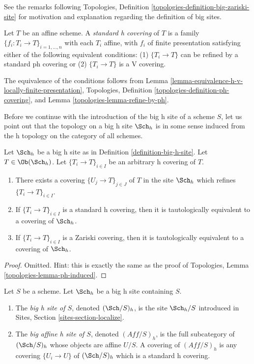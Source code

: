 \noindent
See the remarks following
Topologies, Definition \ref{topologies-definition-big-zariski-site}
for motivation and explanation regarding the definition of big sites.

\begin{definition}
\label{definition-standard-h}
Let $T$ be an affine scheme. A {\it standard h covering} of $T$
is a family $\{f_i : T_i \to T\}_{i = 1, \ldots, n}$ with each $T_i$
affine, with $f_i$ of finite presentation satisfying either of the
following equivalent conditions: (1) $\{T_i \to T\}$ can be refined by
a standard ph covering or (2) $\{T_i \to T\}$ is a V covering.
\end{definition}

\noindent
The equivalence of the conditions follows from
Lemma \ref{lemma-equivalence-h-v-locally-finite-presentation},
Topologies, Definition \ref{topologies-definition-ph-covering}, and
Lemma \ref{topologies-lemma-refine-by-ph}.

\medskip\noindent
Before we continue with the introduction of the big h site of
a scheme $S$, let us point out that the topology on a big h site
$\Sch_h$ is in some sense induced from the h topology
on the category of all schemes.

\begin{lemma}
\label{lemma-h-induced}
Let $\Sch_h$ be a big h site as in
Definition \ref{definition-big-h-site}.
Let $T \in \Ob(\Sch_h)$.
Let $\{T_i \to T\}_{i \in I}$ be an arbitrary h covering of $T$.
\begin{enumerate}
\item There exists a covering $\{U_j \to T\}_{j \in J}$ of $T$ in the site
$\Sch_h$ which refines $\{T_i \to T\}_{i \in I}$.
\item If $\{T_i \to T\}_{i \in I}$ is a standard h covering, then
it is tautologically equivalent to a covering of $\Sch_h$.
\item If $\{T_i \to T\}_{i \in I}$ is a Zariski covering, then
it is tautologically equivalent to a covering of $\Sch_h$.
\end{enumerate}
\end{lemma}

\begin{proof}
Omitted. Hint: this is exactly the same as the proof of
Topologies, Lemma \ref{topologies-lemma-ph-induced}.
\end{proof}

\begin{definition}
\label{definition-big-small-h}
Let $S$ be a scheme. Let $\Sch_h$ be a big h site containing $S$.
\begin{enumerate}
\item The {\it big h site of $S$}, denoted
$(\Sch/S)_h$, is the site $\Sch_h/S$
introduced in Sites, Section \ref{sites-section-localize}.
\item The {\it big affine h site of $S$}, denoted
$(\textit{Aff}/S)_h$, is the full subcategory of
$(\Sch/S)_h$ whose objects are affine $U/S$.
A covering of $(\textit{Aff}/S)_h$ is any covering
$\{U_i \to U\}$ of $(\Sch/S)_h$ which is a standard h covering.
\end{enumerate}
\end{definition}

